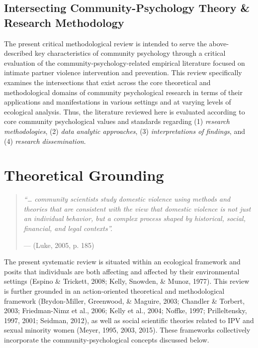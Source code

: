\documentclass[11pt,]{tufte-book}
\begin{document}
\section{Intersecting Community-Psychology Theory \& Research
Methodology}\label{intersecting-community-psychology-theory-research-methodology}

The present critical methodological review is intended to serve the
above-described key characteristics of community psychology through a
critical evaluation of the community-psychology-related empirical
literature focused on intimate partner violence intervention and
prevention. This review specifically examines the intersections that
exist across the core theoretical and methodological domains of
community psychological research in terms of their applications and
manifestations in various settings and at varying levels of ecological
analysis. Thus, the literature reviewed here is evaluated according to
core community psychological values and standards regarding (1)
\emph{research methodologies}, (2) \emph{data analytic approaches}, (3)
\emph{interpretations of findings}, and (4) \emph{research
dissemination}.

\chapter{Theoretical Grounding}\label{theoretical-grounding}

\begin{quote}
\emph{``\ldots{} community scientists study domestic violence using
methods and theories that are consistent with the view that domestic
violence is not just an individual behavior, but a complex process
shaped by historical, social, financial, and legal contexts''.}

\hfill --- (Luke, 2005, p. 185)
\end{quote}

The present systematic review is situated within an ecological framework
and posits that individuals are both affecting and affected by their
environmental settings (Espino \& Trickett, 2008; Kelly, Snowden, \&
Munoz, 1977). This review is further grounded in an action-oriented
theoretical and methodological framework (Brydon-Miller, Greenwood, \&
Maguire, 2003; Chandler \& Torbert, 2003; Friedman-Nimz et al., 2006;
Kelly et al., 2004; Noffke, 1997; Prilleltensky, 1997, 2001; Seidman,
2012), as well as social scientific theories related to IPV and sexual
minority women (Meyer, 1995, 2003, 2015). These frameworks collectively
incorporate the community-psychological concepts discussed below.
\end{document}
